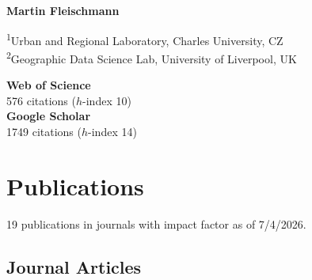 \documentclass[12pt,a4paper]{report}
\newcommand{\myname}{Martin Fleischmann}
\newcommand{\namefont}[1]{{\normalfont\bfseries\Huge{#1}}}
\begin{document}
    \raggedright{}

    \namefont{\myname}

    \vspace{1em}

    \begin{minipage}[t]{0.6\textwidth}
        \begin{flushleft}
            \textsuperscript{1}Urban and Regional Laboratory, Charles University, CZ \\
            \textsuperscript{2}Geographic Data Science Lab, University of Liverpool, UK \\
        \end{flushleft}
    \end{minipage}%
    \begin{minipage}[t]{0.4\textwidth}
        \begin{flushright}
            \textbf{Web of Science} \\
            576 citations ($h$-index 10) \\
            \textbf{Google Scholar} \\
            1749 citations ($h$-index 14)
        \end{flushright}
    \end{minipage}%


    \section*{Publications}

    19 publications in journals with impact factor as of 7/4/2026.

    \subsection*{Journal Articles}
\end{document}
